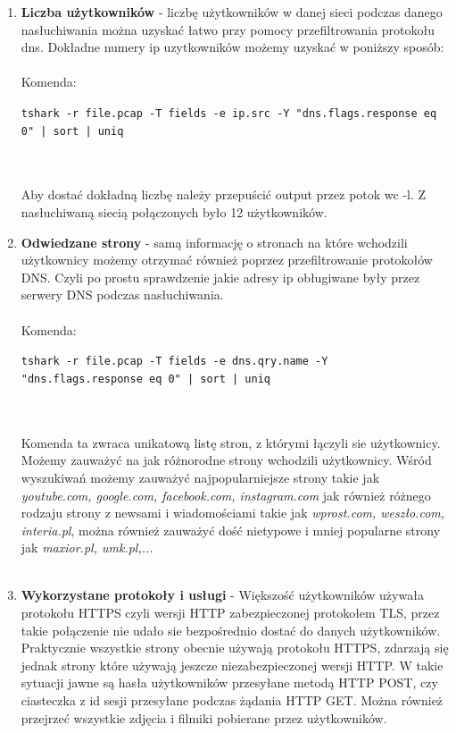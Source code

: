 \documentclass{article}
\begin{document}
\begin{enumerate}[] 
\item \textbf{Liczba użytkowników} - liczbę użytkowników w danej sieci podczas danego nasłuchiwania można uzyskać łatwo przy pomocy przefiltrowania protokołu dns.
Dokładne numery ip uzytkowników możemy uzyskać w poniższy sposób:
\\
\\
Komenda: 
\begin{small}\texttt{tshark -r file.pcap -T fields -e ip.src -Y "dns.flags.response eq 0" | sort | uniq}
\end{small}
\\
\\
Aby dostać dokładną liczbę należy przepuścić output przez potok wc -l. Z nasłuchiwaną siecią połączonych było 12 użytkowników.
\\
\item \textbf{Odwiedzane strony} - samą informację o stronach na które wchodzili użytkownicy możemy otrzymać również poprzez przefiltrowanie protokołów DNS. Czyli po prostu sprawdzenie jakie adresy ip obługiwane były przez serwery DNS podczas nasłuchiwania.
 \\
\\
Komenda: 
\begin{small}\texttt{tshark -r file.pcap -T fields -e dns.qry.name -Y "dns.flags.response eq 0" | sort | uniq}
\end{small}
\\
\\
Komenda ta zwraca unikatową listę stron, z którymi łączyli sie użytkownicy. Możemy zauważyć na jak różnorodne strony wchodzili użytkownicy. Wśród wyszukiwań możemy zauważyć najpopularniejsze strony takie jak \textit{youtube.com, google.com, facebook.com, instagram.com} jak również różnego rodzaju strony z newsami i wiadomościami takie jak \textit{wprost.com, weszło.com, interia.pl}, można również zauważyć dość nietypowe i mniej popularne strony jak \textit{maxior.pl, umk.pl,...}
\\
\\
\item \textbf{Wykorzystane protokoły i usługi} - Większość użytkowników używała protokołu HTTPS czyli wersji HTTP zabezpieczonej protokołem TLS, przez takie połączenie nie udało sie bezpośrednio dostać do danych użytkowników. Praktycznie wszystkie strony obecnie używają protokołu HTTPS, zdarzają się jednak strony które używają jeszcze niezabezpieczonej wersji HTTP. W takie sytuacji jawne są hasła użytkowników przesyłane metodą HTTP POST, czy ciasteczka z id sesji przesyłane podczas żądania HTTP GET. Można również przejrzeć wszystkie zdjęcia i filmiki pobierane przez użytkowników.

\end{enumerate}
\end{document}

